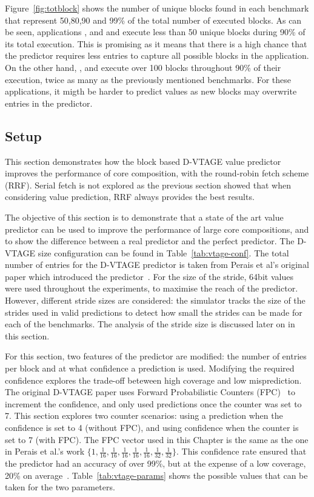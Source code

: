 Figure~\ref{fig:totblock} shows the number of unique blocks found in each benchmark that represent 50,80,90 and 99\% of the total number of executed blocks.
As can be seen, applications ,  and   and  execute less than 50 unique blocks during 90\% of its total execution.
This is promising as it means that there is a high chance that the predictor requires less entries to capture all possible blocks in the application.
On the other hand, , and  execute over 100 blocks throughout 90\% of their execution, twice as many as the previously mentioned benchmarks.
For these applications, it migth be harder to predict values as new blocks may overwrite entries in the predictor.

\subsection{Setup}
This section demonstrates how the block based D-VTAGE value predictor improves the performance of core composition, with the round-robin fetch scheme (RRF).
Serial fetch is not explored as the previous section showed that when considering value prediction, RRF always provides the best results.

The objective of this section is to demonstrate that a state of the art value predictor can be used to improve the performance of large core compositions, and to show the difference between a real predictor and the perfect predictor.
The D-VTAGE size configuration can be found in Table~\ref{tab:vtage-conf}.
The total number of entries for the D-VTAGE predictor is taken from Perais et al's original paper which introduced the predictor~\cite{peraisBeBop2015}.
For the size of the stride, 64bit values were used throughout the experiments, to maximise the reach of the predictor.
However, different stride sizes are considered: the simulator tracks the size of the strides used in valid predictions to detect how small the strides can be made for each of the benchmarks.
The analysis of the stride size is discussed later on in this section.

For this section, two features of the predictor are modified: the number of entries per block and at what confidence a prediction is used.
Modifying the required confidence explores the trade-off beteween high coverage and low misprediction.
The original D-VTAGE paper uses Forward Probabilistic Counters (FPC)~\cite{riley2006fpc} to increment the confidence, and only used predictions once the counter was set to 7.
This section explores two counter scenarios: using a prediction when the confidence is set to 4 (without FPC), and using confidence when the counter is set to 7 (with FPC).
The FPC vector used in this Chapter is the same as the one in Perais et al.'s work $\{1,\frac{1}{16},\frac{1}{16},\frac{1}{16},\frac{1}{16},\frac{1}{16},\frac{1}{32},\frac{1}{32}\}$.
This confidence rate ensured that the predictor had an accuracy of over 99\%, but at the expense of a low coverage, 20\% on average~\cite{peraisBeBop2015}.
Table~\ref{tab:vtage-params} shows the possible values that can be taken for the two parameters.

